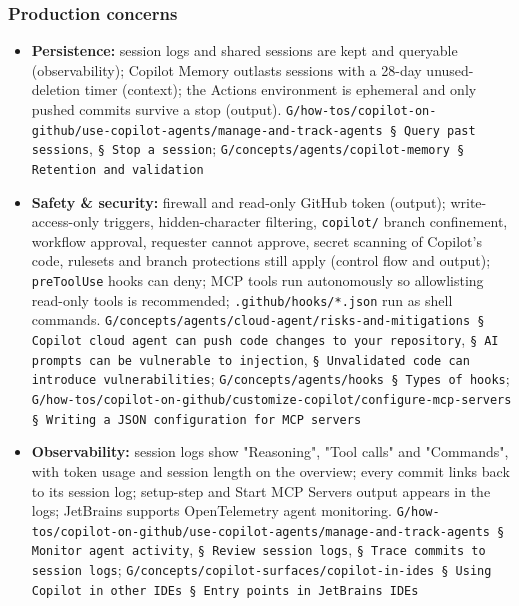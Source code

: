 \subsubsection*{Production concerns}
\begin{itemize}
\item \textbf{Persistence:} session logs and shared sessions are kept and queryable (observability); Copilot Memory outlasts sessions with a 28-day unused-deletion timer (context); the Actions environment is ephemeral and only pushed commits survive a stop (output). \texttt{G/\allowbreak{}how-\allowbreak{}tos/\allowbreak{}copilot-\allowbreak{}on-\allowbreak{}github/\allowbreak{}use-\allowbreak{}copilot-\allowbreak{}agents/\allowbreak{}manage-\allowbreak{}and-\allowbreak{}track-\allowbreak{}agents § Query past sessions}, \texttt{§ Stop a session}; \texttt{G/\allowbreak{}concepts/\allowbreak{}agents/\allowbreak{}copilot-\allowbreak{}memory § Retention and validation}
\item \textbf{Safety \& security:} firewall and read-only GitHub token (output); write-access-only triggers, hidden-character filtering, \texttt{copilot/\allowbreak{}} branch confinement, workflow approval, requester cannot approve, secret scanning of Copilot's code, rulesets and branch protections still apply (control flow and output); \texttt{preToolUse} hooks can deny; MCP tools run autonomously so allowlisting read-only tools is recommended; \texttt{.\allowbreak{}github/\allowbreak{}hooks/\allowbreak{}*.\allowbreak{}json} run as shell commands. \texttt{G/\allowbreak{}concepts/\allowbreak{}agents/\allowbreak{}cloud-\allowbreak{}agent/\allowbreak{}risks-\allowbreak{}and-\allowbreak{}mitigations § Copilot cloud agent can push code changes to your repository}, \texttt{§ AI prompts can be vulnerable to injection}, \texttt{§ Unvalidated code can introduce vulnerabilities}; \texttt{G/\allowbreak{}concepts/\allowbreak{}agents/\allowbreak{}hooks § Types of hooks}; \texttt{G/\allowbreak{}how-\allowbreak{}tos/\allowbreak{}copilot-\allowbreak{}on-\allowbreak{}github/\allowbreak{}customize-\allowbreak{}copilot/\allowbreak{}configure-\allowbreak{}mcp-\allowbreak{}servers § Writing a JSON configuration for MCP servers}
\item \textbf{Observability:} session logs show "Reasoning", "Tool calls" and "Commands", with token usage and session length on the overview; every commit links back to its session log; setup-step and Start MCP Servers output appears in the logs; JetBrains supports OpenTelemetry agent monitoring. \texttt{G/\allowbreak{}how-\allowbreak{}tos/\allowbreak{}copilot-\allowbreak{}on-\allowbreak{}github/\allowbreak{}use-\allowbreak{}copilot-\allowbreak{}agents/\allowbreak{}manage-\allowbreak{}and-\allowbreak{}track-\allowbreak{}agents § Monitor agent activity}, \texttt{§ Review session logs}, \texttt{§ Trace commits to session logs}; \texttt{G/\allowbreak{}concepts/\allowbreak{}copilot-\allowbreak{}surfaces/\allowbreak{}copilot-\allowbreak{}in-\allowbreak{}ides § Using Copilot in other IDEs § Entry points in JetBrains IDEs}

\end{itemize}
